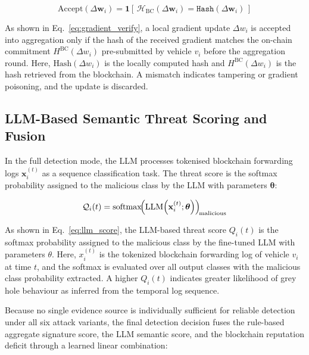 \documentclass[12pt, a4paper]{report}
\begin{document}
\begin{equation}
\label{eq:gradient_verify}
\mathrm{Accept}(\Delta\mathbf{w}_i) =
\mathbf{1}\!\left[\,
\mathcal{H}_{\mathrm{BC}}(\Delta\mathbf{w}_i) =
\mathtt{Hash}(\Delta\mathbf{w}_i)
\,\right]
\end{equation}

As shown in Eq.~\eqref{eq:gradient_verify}, a local gradient update $\Delta w_i$ is accepted into aggregation only if the hash of the received gradient matches the on-chain commitment $H^{\text{BC}}(\Delta w_i)$ pre-submitted by vehicle $v_i$ before the aggregation round. Here, $\text{Hash}(\Delta w_i)$ is the locally computed hash and $H^{\text{BC}}(\Delta w_i)$ is the hash retrieved from the blockchain. A mismatch indicates tampering or gradient poisoning, and the update is discarded.

\subsection{LLM-Based Semantic Threat Scoring and Fusion}

In the full detection mode, the LLM processes tokenised blockchain forwarding
logs $\mathbf{x}_i^{(t)}$ as a sequence classification task. The threat score
is the softmax probability assigned to the malicious class by the LLM with
parameters $\boldsymbol{\theta}$:

\begin{equation}
\label{eq:llm_score}
\mathcal{Q}_i(t) =
\mathrm{softmax}\!\Bigl(
\mathrm{LLM}\!\left(\mathbf{x}_i^{(t)};\boldsymbol{\theta}\right)
\Bigr)_{\!\mathrm{malicious}}
\end{equation}

As shown in Eq.~\eqref{eq:llm_score}, the LLM-based threat score $Q_i(t)$ is the softmax probability assigned to the malicious class by the fine-tuned LLM with parameters $\theta$. Here, $x_i^{(t)}$ is the tokenized blockchain forwarding log of vehicle $v_i$ at time $t$, and the softmax is evaluated over all output classes with the malicious class probability extracted. A higher $Q_i(t)$ indicates greater likelihood of grey hole behaviour as inferred from the temporal log sequence.

Because no single evidence source is individually sufficient for reliable
detection under all six attack variants, the final detection decision fuses
the rule-based aggregate signature score, the LLM semantic score, and the
blockchain reputation deficit through a learned linear combination:
\end{document}

